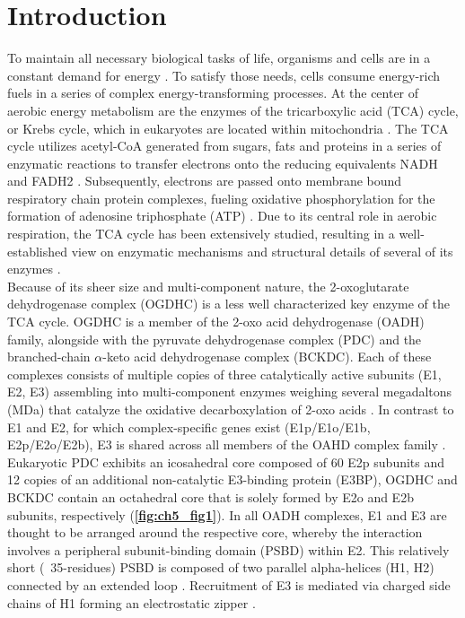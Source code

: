 \section{Introduction}
To maintain all necessary biological tasks of life, organisms and cells are in a constant demand for energy \cite{Rigoulet_2020}. To satisfy those needs, cells consume energy-rich fuels in a series of complex energy-transforming processes. At the center of aerobic energy metabolism are the enzymes of the tricarboxylic acid (TCA) cycle, or Krebs cycle, which in eukaryotes are located within mitochondria \cite{Cavalcanti_2014,Martinez-Reyes_2020,Siriwat_2018}. The TCA cycle utilizes acetyl-CoA generated from sugars, fats and proteins in a series of enzymatic reactions to transfer electrons onto the reducing equivalents NADH and FADH2 \cite{Walsh_2018}. Subsequently, electrons are passed onto membrane bound respiratory chain protein complexes, fueling oxidative phosphorylation for the formation of adenosine triphosphate (ATP) \cite{Kaila_2021,Martinez-Reyes_2016}. Due to its central role in aerobic respiration, the TCA cycle has been extensively studied, resulting in a well-established view on enzymatic mechanisms and structural details of several of its enzymes \cite{Gleason_1994,Joyce_2000,Lauble_1992,Remington_1982,Spinelli_2018,Taylor_2008,Weaver_1996,Yankovskaya_2003}.\\
Because of its sheer size and multi-component nature, the 2-oxoglutarate dehydrogenase complex (OGDHC) is a less well characterized key enzyme of the TCA cycle. OGDHC is a member of the 2-oxo acid dehydrogenase (OADH) family, alongside with the pyruvate dehydrogenase complex (PDC) and the branched-chain $\alpha$-keto acid dehydrogenase complex (BCKDC). Each of these complexes consists of multiple copies of three catalytically active subunits (E1, E2, E3) assembling into multi-component enzymes weighing several megadaltons (MDa) that catalyze the oxidative decarboxylation of 2-oxo acids \cite{Reed_2001, Zhong_2022}. In contrast to E1 and E2, for which complex-specific genes exist (E1p/E1o/E1b, E2p/E2o/E2b), E3 is shared across all members of the OAHD complex family \cite{Nemeria_2021}. Eukaryotic PDC exhibits an icosahedral core composed of 60 E2p subunits and 12 copies of an additional non-catalytic E3-binding protein (E3BP), OGDHC and BCKDC contain an octahedral core that is solely formed by E2o and E2b subunits, respectively (\textbf{\autoref{fig:ch5_fig1}}). In all OADH complexes, E1 and E3 are thought to be arranged around the respective core, whereby the interaction involves a peripheral subunit-binding domain (PSBD) within E2. This relatively short (~35-residues) PSBD is composed of two parallel alpha-helices (H1, H2) connected by an extended loop \cite{Robien_1992}. Recruitment of E3 is mediated via charged side chains of H1 forming an electrostatic zipper \cite{Mande_1996}.\\

